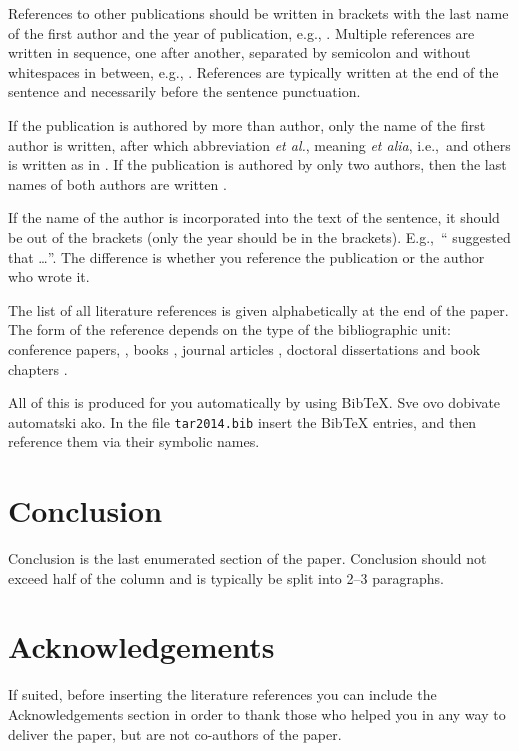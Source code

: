 \documentclass[10pt, a4paper]{article}
\begin{document}
References to other publications should be written in brackets with the last name of the first author and the year of publication, e.g., \citep{chomsky-73}.  Multiple references are written in sequence, one after another, separated by semicolon and without whitespaces in between, e.g., \citep{chomsky-73,chave-64,feigl-58}. References are typically written at the end of the sentence and necessarily before the sentence punctuation.

If the publication is authored by more than author, only the name of the first author is written, after which abbreviation \emph{et al.}, meaning \emph{et alia}, i.e.,~and others is written as in \citep{johnson-etc}. If the publication is authored by only two authors, then the last names of both authors are written \citep{johnson-howells}.

If the name of the author is incorporated into the text of the sentence, it should be out of the brackets (only the year should be in the brackets). E.g.,~``\citet{chomsky-73}
suggested that \dots''. The difference is whether you reference the publication or the author who wrote it. 

The list of all literature references is given alphabetically at the end of the paper. The form of the reference depends on the type of the bibliographic unit: conference papers,
\citep{chave-64}, books \citep{butcher-81}, journal articles
\citep{howells-51}, doctoral dissertations \citep{croft-78} and book chapters \citep{feigl-58}. 

All of this is produced for you automatically by using BibTeX. Sve ovo dobivate automatski ako. In the file \texttt{tar2014.bib} insert the BibTeX entries, and then reference them via their symbolic names.

\section{Conclusion}

Conclusion is the last enumerated section of the paper. Conclusion should not exceed half of the column and is typically be split into 2--3 paragraphs.

\section*{Acknowledgements}

If suited, before inserting the literature references you can include the Acknowledgements section in order to thank those who helped you in any way to deliver the paper, but are not co-authors of the paper.


 
\end{document}
